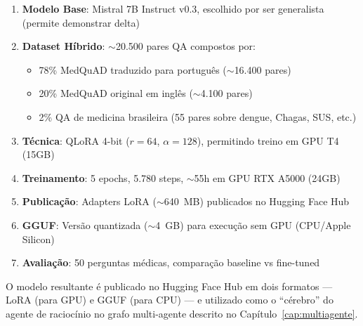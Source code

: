 \begin{enumerate}
    \item \textbf{Modelo Base}: Mistral 7B Instruct v0.3, escolhido por ser generalista (permite demonstrar delta)
    \item \textbf{Dataset Híbrido}: $\sim$20.500 pares QA compostos por:
    \begin{itemize}
        \item 78\% MedQuAD traduzido para português ($\sim$16.400 pares)
        \item 20\% MedQuAD original em inglês ($\sim$4.100 pares)
        \item 2\% QA de medicina brasileira (55 pares sobre dengue, Chagas, SUS, etc.)
    \end{itemize}
    \item \textbf{Técnica}: QLoRA 4-bit ($r=64$, $\alpha=128$), permitindo treino em GPU T4 (15GB)
    \item \textbf{Treinamento}: 5 epochs, 5.780 steps, $\sim$55h em GPU RTX A5000 (24GB)
    \item \textbf{Publicação}: Adapters LoRA ($\sim$640~MB) publicados no Hugging Face Hub
    \item \textbf{GGUF}: Versão quantizada ($\sim$4~GB) para execução sem GPU (CPU/Apple Silicon)
    \item \textbf{Avaliação}: 50 perguntas médicas, comparação baseline vs fine-tuned
\end{enumerate}

O modelo resultante é publicado no Hugging Face Hub em dois formatos --- LoRA (para GPU) e GGUF (para CPU) --- e utilizado como o ``cérebro'' do agente de raciocínio no grafo multi-agente descrito no Capítulo~\ref{cap:multiagente}.
